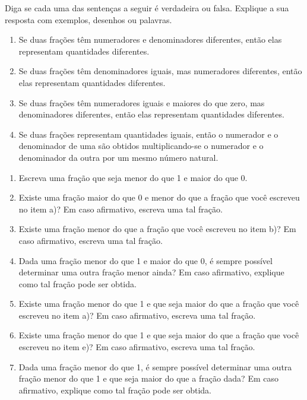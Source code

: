 \begin{atividade}{}\label{chap4-ativ23}

Diga se cada uma das sentenças a seguir é verdadeira ou falsa. Explique a sua resposta com exemplos, desenhos ou palavras.
\begin{enumerate}
 \item  Se duas frações têm numeradores e denominadores diferentes, então e\-las representam quantidades diferentes.
 \item Se duas frações têm denominadores iguais, mas numeradores diferentes, então elas representam quantidades diferentes.
 \item Se duas frações têm numeradores iguais e maiores do que zero, mas denominadores diferentes, então elas representam quantidades diferentes.
 \item Se duas frações representam quantidades iguais, então o numerador e o denominador de uma são obtidos multiplicando-se o numerador e o denominador da outra por um mesmo número natural.
\end{enumerate}
\end{atividade}

\clearpage
\begin{atividade}
\label{chap4-ativ24}

\begin{enumerate}
 \item Escreva uma fração que seja menor do que 1 e maior do que 0.
 \item Existe uma fração maior do que 0 e menor do que a fração que você escreveu no item a)? Em caso afirmativo, escreva uma tal fração.
 \item Existe uma fração menor do que a fração que você escreveu no item b)? Em caso afirmativo, escreva uma tal fração.
 \item Dada uma fração menor do que 1 e maior do que 0, é sempre possível determinar uma outra fração menor ainda? Em caso afirmativo, explique como tal fração pode ser obtida.
 \item Existe uma fração menor do que 1 e que seja maior do que a fração que você escreveu no item a)? Em caso afirmativo, escreva uma tal fração.
 \item Existe uma fração menor do que 1 e que seja maior do que a fração que você escreveu no item e)? Em caso afirmativo, escreva uma tal fração.
 \item Dada uma fração menor do que 1, é sempre possível determinar uma outra fração menor do que 1 e que seja maior do que a fração dada? Em caso afirmativo, explique como tal fração pode ser obtida.
\end{enumerate}
\end{atividade}

